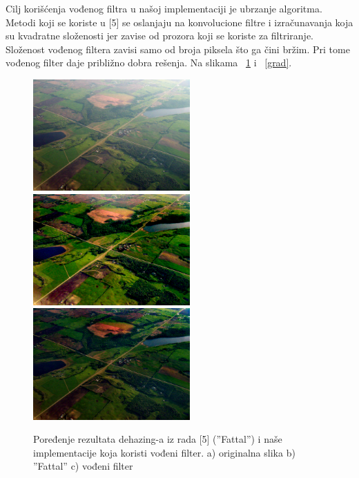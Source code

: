 \documentclass[a4paper,12pt,titlepage]{article}
\begin{document}
Cilj korišćenja vođenog filtra u našoj implementaciji je ubrzanje algoritma. Metodi koji se koriste u [5] se oslanjaju na konvolucione filtre i izračunavanja koja su kvadratne složenosti jer zavise od prozora koji se koriste za filtriranje. Složenost vođenog filtera zavisi samo od broja piksela što ga čini bržim. Pri tome vođenog filter daje približno dobra rešenja. Na slikama ~\ref{aerial} i ~\ref{grad}. 

\begin{figure}[ht!]
\centering
\includegraphics[width=60mm]{img/aerial.png}
\includegraphics[width=60mm]{img/aerialFattal.png}
\includegraphics[width=60mm]{img/aerialDe.png}
\caption{Poređenje rezultata dehazing-a iz rada [5] (''Fattal'') i naše implementacije koja koristi vođeni filter. a) originalna slika b) ''Fattal'' c) vođeni filter}
\label{aerial}
\end{figure} 
\end{document}
